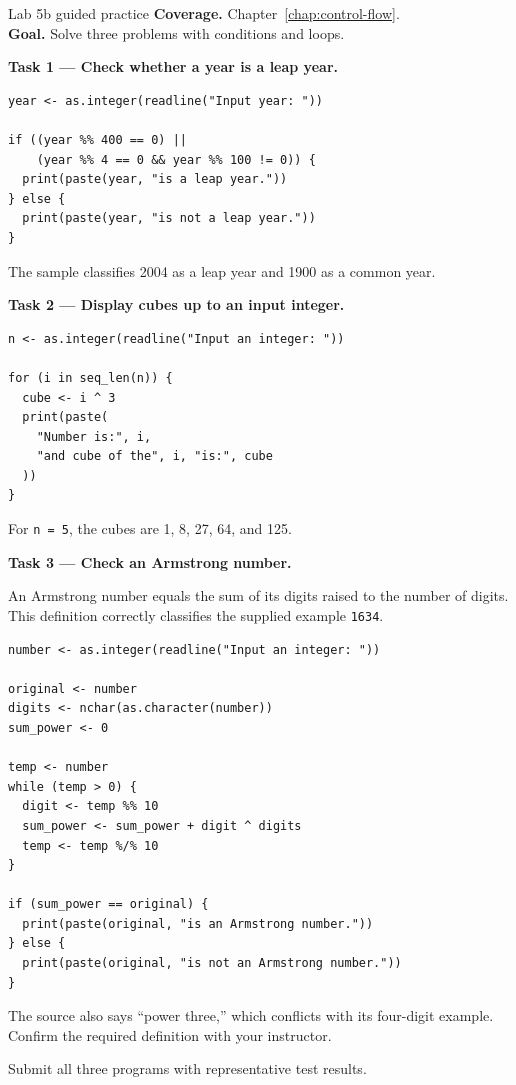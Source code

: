 
\begin{labproject}{Lab 5b guided practice}
\textbf{Coverage.} Chapter~\ref{chap:control-flow}.\\
\textbf{Goal.} Solve three problems with conditions and loops.

\textbf{Task 1 --- Check whether a year is a leap year.}

\begin{lstlisting}[style=dsr]
year <- as.integer(readline("Input year: "))

if ((year %% 400 == 0) ||
    (year %% 4 == 0 && year %% 100 != 0)) {
  print(paste(year, "is a leap year."))
} else {
  print(paste(year, "is not a leap year."))
}
\end{lstlisting}

The sample classifies 2004 as a leap year and 1900 as a common year.

\textbf{Task 2 --- Display cubes up to an input integer.}

\begin{lstlisting}[style=dsr]
n <- as.integer(readline("Input an integer: "))

for (i in seq_len(n)) {
  cube <- i ^ 3
  print(paste(
    "Number is:", i,
    "and cube of the", i, "is:", cube
  ))
}
\end{lstlisting}

For \texttt{n = 5}, the cubes are 1, 8, 27, 64, and 125.

\textbf{Task 3 --- Check an Armstrong number.}

An Armstrong number equals the sum of its digits raised to the number of digits. This definition correctly classifies the supplied example \texttt{1634}.

\begin{lstlisting}[style=dsr]
number <- as.integer(readline("Input an integer: "))

original <- number
digits <- nchar(as.character(number))
sum_power <- 0

temp <- number
while (temp > 0) {
  digit <- temp %% 10
  sum_power <- sum_power + digit ^ digits
  temp <- temp %/% 10
}

if (sum_power == original) {
  print(paste(original, "is an Armstrong number."))
} else {
  print(paste(original, "is not an Armstrong number."))
}
\end{lstlisting}

\begin{pitfall}
The source also says ``power three,'' which conflicts with its four-digit example. Confirm the required definition with your instructor.
\end{pitfall}
\end{labproject}

\begin{labdeliverable}
Submit all three programs with representative test results.
\end{labdeliverable}
